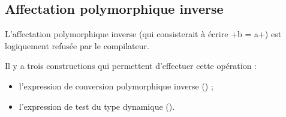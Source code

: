 \subsection{Affectation polymorphique inverse}

L'affectation polymorphique inverse (qui consisterait à écrire \ggsq+b = a+) est logiquement refusée par le compilateur.

Il y a trois constructions qui permettent d'effectuer cette opération :
\begin{itemize}
  \item l'expression de conversion polymorphique inverse () ;
  \item l'expression de test du type dynamique ().
\end{itemize}

